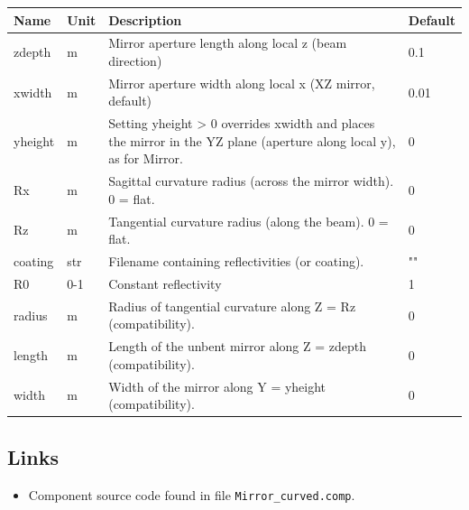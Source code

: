\begin{longtable}{p{}p{}p{}p{}}
\toprule
\textbf{Name} & \textbf{Unit} & \textbf{Description} & \textbf{Default} \\
\midrule
\endhead
zdepth & m & Mirror aperture length along local z (beam direction) & 0.1 \\
xwidth & m & Mirror aperture width along local x (XZ mirror, default) & 0.01 \\
yheight & m & Setting yheight \textgreater{} 0 overrides xwidth and places the mirror in the YZ plane (aperture along local y), as for Mirror. & 0 \\
Rx & m & Sagittal curvature radius (across the mirror width). 0 = flat. & 0 \\
Rz & m & Tangential curvature radius (along the beam). 0 = flat. & 0 \\
coating & str & Filename containing reflectivities (or coating). & "" \\
R0 & 0-1 & Constant reflectivity & 1 \\
radius & m & Radius of tangential curvature along Z = Rz (compatibility). & 0 \\
length & m & Length of the unbent mirror along Z = zdepth (compatibility). & 0 \\
width & m & Width of the mirror along Y = yheight (compatibility). & 0 \\
\bottomrule
\end{longtable}

\subsection*{Links}
\begin{itemize}
  \item Component source code found in file \texttt{Mirror\_curved.comp}.
\end{itemize}
